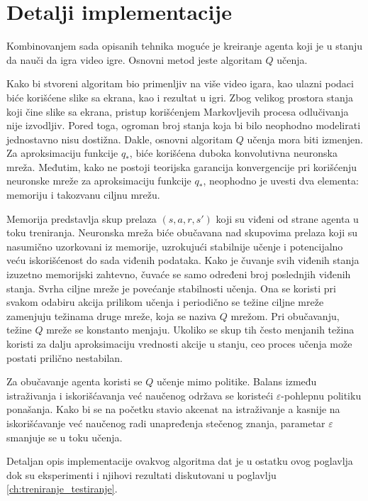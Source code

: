 \chapter{Detalji implementacije}
\label{ch:implementacija}

{\color{red} Kombinovanjem sada opisanih tehnika moguće je kreiranje agenta koji je u stanju da nauči da igra video igre. Osnovni metod jeste algoritam $Q$ učenja. 
\par 
Kako bi stvoreni algoritam bio primenljiv na više video igara, kao ulazni podaci biće korišćene slike sa ekrana, kao i rezultat u igri. Zbog velikog prostora stanja koji čine slike sa ekrana, pristup korišćenjem Markovljevih procesa odlučivanja nije izvodljiv. Pored toga, ogroman broj stanja koja bi bilo neophodno modelirati jednostavno nisu dostižna.  Dakle, osnovni algoritam $Q$ učenja mora biti izmenjen. Za aproksimaciju funkcije $q_*$, biće korišćena duboka konvolutivna neuronska mreža. Međutim, kako ne postoji teorijska garancija konvergencije pri korišćenju neuronske mreže za aproksimaciju funkcije $q_*$, neophodno je uvesti dva elementa: memoriju i takozvanu ciljnu mrežu. 
\par 
Memorija predstavlja skup prelaza $(s, a, r, s')$ koji su viđeni od strane agenta u toku treniranja. Neuronska mreža biće obučavana nad skupovima prelaza koji su nasumično uzorkovani iz memorije, uzrokujući stabilnije učenje i potencijalno veću iskorišćenost do sada viđenih podataka. Kako je čuvanje svih viđenih stanja izuzetno memorijski zahtevno, čuvaće se samo određeni broj poslednjih viđenih stanja. Svrha ciljne mreže je povećanje stabilnosti učenja. Ona se koristi pri svakom odabiru akcija prilikom učenja i periodično se težine ciljne mreže zamenjuju težinama druge mreže, koja se naziva $Q$ mrežom. Pri obučavanju, težine $Q$ mreže se konstanto menjaju. Ukoliko se skup tih često menjanih težina koristi za dalju aproksimaciju vrednosti akcije u stanju, ceo proces učenja može postati prilično nestabilan. 
\par 
Za obučavanje agenta koristi se $Q$ učenje mimo politike. Balans između istraživanja i iskorišćavanja već naučenog održava se koristeći $\varepsilon$-pohlepnu politiku ponašanja. Kako bi se na početku stavio akcenat na istraživanje a kasnije na iskorišćavanje već naučenog radi unapređenja stečenog znanja, parametar $\varepsilon$ smanjuje se u toku učenja.
\par 
Detaljan opis implementacije ovakvog algoritma dat je u ostatku ovog poglavlja dok su eksperimenti i njihovi rezultati diskutovani u poglavlju \ref{ch:treniranje_testiranje}.}
